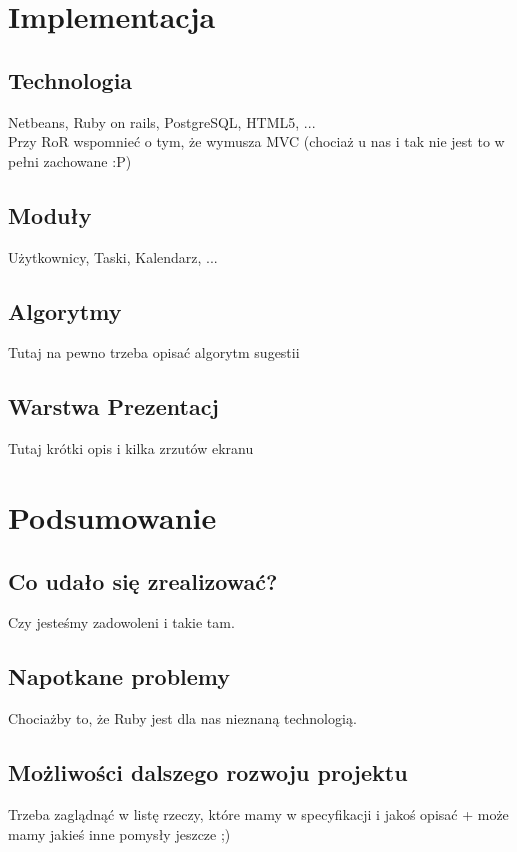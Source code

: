 \documentclass[pdflatex,11pt]{aghdpl}
\begin{document}

\chapter{Implementacja}

\section{Technologia}

Netbeans, Ruby on rails, PostgreSQL, HTML5, ...\\
Przy RoR wspomnieć o tym, że wymusza MVC (chociaż u nas i tak nie jest to w pełni zachowane :P)

\section{Moduły}

Użytkownicy, Taski, Kalendarz, ...

\section{Algorytmy}

Tutaj na pewno trzeba opisać algorytm sugestii

\section{Warstwa Prezentacj}

Tutaj krótki opis i kilka zrzutów ekranu


\chapter{Podsumowanie}

\section{Co udało się zrealizować?}

Czy jesteśmy zadowoleni i takie tam.

\section{Napotkane problemy}

Chociażby to, że Ruby jest dla nas nieznaną technologią.

\section{Możliwości dalszego rozwoju projektu}

Trzeba zaglądnąć w listę rzeczy, które mamy w specyfikacji i jakoś opisać + może mamy jakieś inne pomysły jeszcze ;)
\end{document}

